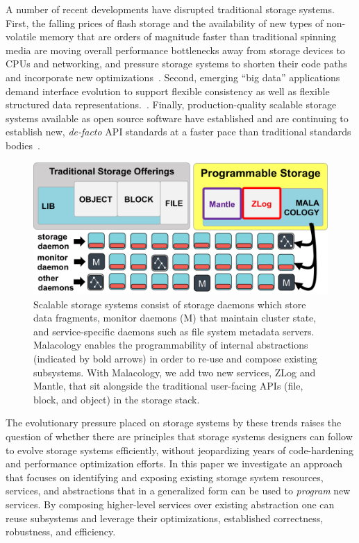 \documentclass[preprint]{sigplanconf-eurosys}
\begin{document}
A number of recent developments have disrupted traditional storage systems.
First, the falling prices of flash storage and the availability of new types of
non-volatile memory that are orders of magnitude faster than traditional
spinning media are moving overall performance bottlenecks away from storage
devices to CPUs and networking, and pressure storage systems to shorten their
code paths and incorporate new
optimizations~\cite{gray_tape_2007,gray_flash_2008}.  Second, emerging ``big
data'' applications demand interface evolution to support flexible consistency
as well as flexible structured data 
representations.~\cite{apache_contributors_parquet_2014}.  Finally, production-quality scalable
storage systems available as open source software have established and are
continuing to establish new, \emph{de-facto} API standards at a faster pace
than traditional standards
bodies~\cite{snia_implementing_2014,linux_foundation_kinetic_2015}.

\begin{figure}[tb]
\centering
\includegraphics{figures/overview.png}
\caption{Scalable storage systems consist of storage daemons which store data
fragments, monitor daemons (M) that maintain cluster state, and service-specific
daemons such as file system metadata servers. Malacology enables the
programmability of internal abstractions (indicated by bold arrows) in order to
re-use and compose existing subsystems.  With Malacology, we add two new
services, ZLog and Mantle, that sit alongside the traditional user-facing APIs
(file, block, and object) in the storage stack.  \label{fig:overview}}
\end{figure}

The evolutionary pressure placed on storage systems by these trends raises the
question of whether there are principles that storage systems designers can
follow to evolve storage systems efficiently, without jeopardizing years of
code-hardening and performance optimization efforts.  In this paper we
investigate an approach that focuses on identifying and exposing existing
storage system resources, services, and abstractions that in a generalized form
can be used to \emph{program} new services. By composing higher-level services
over existing abstraction one can reuse subsystems and leverage their
optimizations, established correctness, robustness, and efficiency. 
\end{document}
